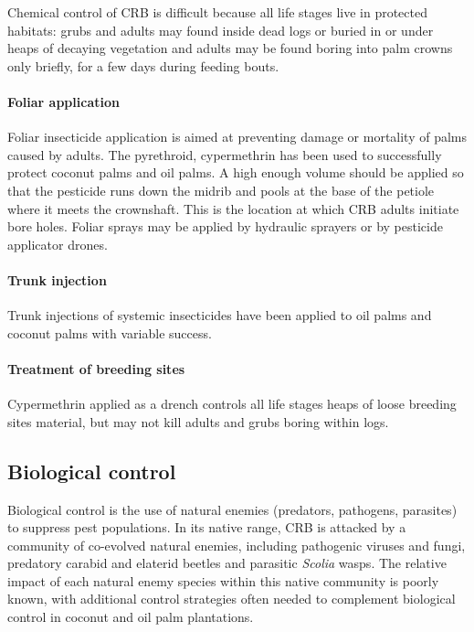 \documentclass[twocolumn,letterpaper]{scrartcl}
\begin{document}
Chemical control of CRB is difficult because all life stages live in protected habitats: grubs and adults may found inside dead logs or buried in or under heaps of decaying vegetation and adults may be found boring into palm crowns only briefly, for a few days during feeding bouts. 

\paragraph{Foliar application}
Foliar insecticide application is aimed at preventing damage or mortality of palms caused by adults. The pyrethroid, cypermethrin has been used to successfully protect coconut palms and oil palms. A high enough volume should be applied so that the pesticide runs down the midrib and pools at the base of the petiole where it meets the crownshaft. This is the location at which CRB adults initiate bore holes. Foliar sprays may be applied by hydraulic sprayers or by pesticide applicator drones.  

\paragraph{Trunk injection}
Trunk injections of systemic insecticides have been applied to oil palms and coconut palms with variable success.

\paragraph{Treatment of breeding sites}
Cypermethrin applied as a drench controls all life stages heaps of loose breeding sites material, but may not kill adults and grubs boring within logs.

\subsection{Biological control}

Biological control is the use of natural enemies (predators, pathogens, parasites) to suppress pest populations. In its native range, CRB is attacked by a community of co-evolved natural enemies, including pathogenic viruses and fungi, predatory carabid and elaterid beetles  and  parasitic  \textit{Scolia}  wasps.  The  relative  impact  of  each  natural  enemy  species  within  this  native community is poorly known, with additional control strategies often needed to complement biological control in coconut and oil palm plantations.
\end{document}
